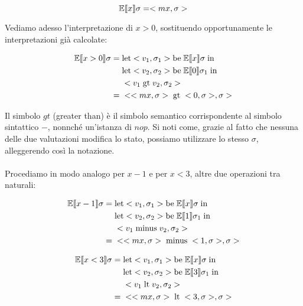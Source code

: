     \begin{equation*}
        \mathbb{E}\llbracket x \rrbracket\sigma = <mx, \sigma>
    \end{equation*}
    
    Vediamo adesso l'interpretazione di $x>0$, sostituendo opportunamente le interpretazioni già calcolate:
    
    \begin{align*}
        \mathbb{E}\llbracket x>0 \rrbracket\sigma =\;& \mbox{let} <v_1,\sigma_1> \mbox{be}\; \mathbb{E}\llbracket x \rrbracket\sigma\; \mbox{in}\;\\
        &\mbox{let} <v_2,\sigma_2> \mbox{be}\; \mathbb{E}\llbracket 0 \rrbracket\sigma_1\; \mbox{in}\;\\
        &<v_1\; \mbox{gt}\; v_2, \sigma_2>\\
        =\;& <<mx,\sigma>\; \mbox{gt}\; <0, \sigma>, \sigma>
    \end{align*}
    
    Il simbolo $gt$ (greater than) è il simbolo semantico corrispondente al simbolo sintattico $-$, nonnché un'istanza di $nop$. Si noti come, grazie al fatto che nessuna delle due valutazioni modifica lo stato, possiamo utilizzare lo stesso $\sigma$, alleggerendo così la notazione.\\
    \\
    Procediamo in modo analogo per $x-1$ e per $x<3$, altre due operazioni tra naturali:
    
    \begin{align*}
        \mathbb{E}\llbracket x-1 \rrbracket\sigma =\;& \mbox{let} <v_1,\sigma_1> \mbox{be}\; \mathbb{E}\llbracket x \rrbracket\sigma\; \mbox{in}\;\\
        &\mbox{let} <v_2,\sigma_2> \mbox{be}\; \mathbb{E}\llbracket 1 \rrbracket\sigma_1\; \mbox{in}\;\\
        &<v_1\; \mbox{minus}\; v_2, \sigma_2>\\
        =\;& <<mx,\sigma>\; \mbox{minus}\; <1, \sigma>, \sigma>
    \end{align*}
    
    \begin{align*}
        \mathbb{E}\llbracket x<3 \rrbracket\sigma =\;& \mbox{let} <v_1,\sigma_1> \mbox{be}\; \mathbb{E}\llbracket x \rrbracket\sigma\; \mbox{in}\;\\
        &\mbox{let} <v_2,\sigma_2> \mbox{be}\; \mathbb{E}\llbracket 3 \rrbracket\sigma_1\; \mbox{in}\;\\
        &<v_1\; \mbox{lt}\; v_2, \sigma_2>\\
        =\;& <<mx,\sigma>\; \mbox{lt}\; <3, \sigma>, \sigma>
    \end{align*}
    
